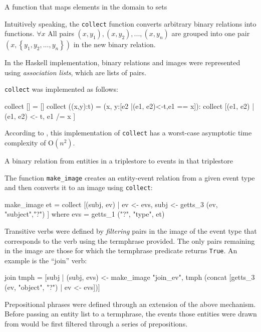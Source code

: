 \documentclass[../main.tex]{subfiles}
\begin{document}
\begin{definition}
  A function that maps elements in the domain to sets
\end{definition}

Intuitively speaking, the \texttt{collect} function converts arbitrary binary
relations into functions.  $\forall x$ All pairs $(x, y_1), (x, y_2), ..., (x,
y_n)$ are grouped into one pair $(x, \left\{y_1, y_2, ..., y_n\right\})$ in the new binary
relation.

In the Haskell implementation, binary relations and images were represented using {\em association
lists}, which are lists of pairs\cite{frost2014denotational}.

\texttt{collect} was implemented as follows:

\begin{code}
collect [] = []
collect ((x,y):t) = (x, y:[e2 |(e1, e2)<-t,e1 == x]): collect [(e1, e2) | (e1, e2) <- t, e1 /= x ]
\end{code}

According to \cite{agboola2015extensible}, this implementation of \texttt{collect} has a worst-case asymptotic time complexity of
O$(n^2)$.

\begin{definition}
  A binary relation from entities in a triplestore to events in that triplestore
\end{definition}

The function \texttt{make\_image} creates an entity-event relation from a given event type and then converts it to an image using \texttt{collect}:

\begin{code}
  make_image et = collect [(subj, ev) | ev <- evs, subj <- getts_3 (ev, "subject","?") ]
    where evs = getts_1 ("?", "type",  et)
\end{code}

Transitive verbs were defined by {\em filtering} pairs in the image of the event
type that corresponds to the verb using the termphrase provided.  The only pairs remaining in the image are those
for which the termphrase predicate returns \texttt{True}.  An example is the
``join'' verb:

\begin{code}
  join tmph = [subj | (subj, evs) <- make_image "join_ev",
       tmph (concat [getts_3 (ev,  "object", "?") | ev <- evs])]
\end{code}

Prepositional phrases were defined through an extension of the above
mechanism.  Before passing an entity list to a termphrase, the events
those entities were drawn from would be first filtered through a series
of prepositions.
\end{document}
